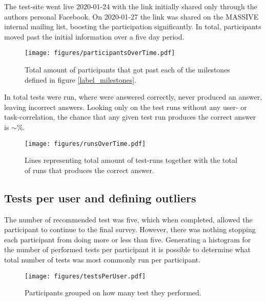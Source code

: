     The test-site went live 2020-01-24 with the link initially shared only
    through the authors personal Facebook. On 2020-01-27 the link was shared on
    the MASSIVE internal mailing list, boosting the participation
    significantly. In total,  participants moved
    past the initial information over a five day period.

    \begin{figure}[h!]
      \centering
      \texttt{[image: figures/participantsOverTime.pdf]}
      \vspace{-0.3cm}
      \caption{
        Total amount of participants that got past each of the milestones
        defined in figure \ref{label_milestones}.
      }
    \end{figure}

    In total  tests were run, where
     were answered correctly,
     never produced an answer, leaving
     incorrect answers. Looking only on the test
    runs without any user- or task-correlation, the chance that any given test run
    produces the correct answer is $\sim$\%.

    \begin{figure}[h!]
      \centering
      \texttt{[image: figures/runsOverTime.pdf]}
      \vspace{-0.3cm}
      \caption{Lines representing total amount of test-runs together with
        the total of runs that produces the correct answer.}
      \vspace{-0.4cm}
    \end{figure}

  \newpage
  \subsection{Tests per user and defining outliers}

    The number of recommended test was five, which when completed, allowed
    the participant to continue to the final survey. However, there was
    nothing stopping each participant from doing more or less than five.
    Generating a histogram for the number of performed tests per
    participant it is possible to determine what total number of tests was most
    commonly run per participant.

    \begin{figure}[h!]
      \centering
      \texttt{[image: figures/testsPerUser.pdf]}
      \caption{Participants grouped on how many test they performed.}
    \end{figure}

